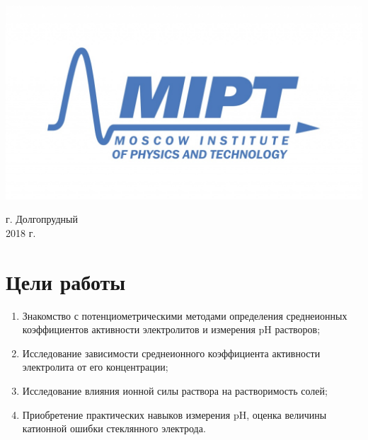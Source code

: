 \documentclass[a4paper, 12pt]{article}
\newenvironment{bottompar}{\par\vspace*{\fill}}{\clearpage}
\begin{document}
\begin{titlepage}
\begin{bottompar}
	\begin{center}
		\includegraphics[width = 80 mm]{logo.jpg}
	\end{center}
	{\large г. Долгопрудный\\2018 г.}

\end{bottompar}
\vfill %

\end{titlepage}

\setcounter{page}{2}

\newpage
\section{Цели работы}
	\begin{enumerate}
	
		\item 
		Знакомство с потенциометрическими методами определения среднеионных коэффициентов активности электролитов и измерения pH растворов;   
		\item 
		Исследование зависимости среднеионного коэффициента активности электролита от его концентрации;   
		\item 
		Исследование влияния ионной силы раствора на растворимость солей;
		\item
		Приобретение практических навыков измерения pH, оценка величины катионной ошибки стеклянного электрода.   
	\end{enumerate}
	
\end{document}
